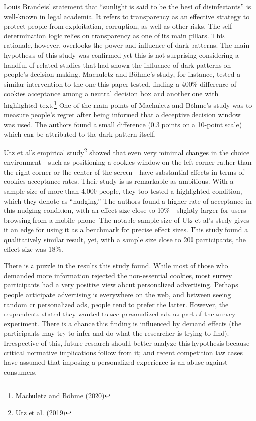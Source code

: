 \documentclass[
  11pt,
  letterpaper,
]{article}
\begin{document}
Louis Brandeis' statement that ``sunlight is said to be the best of disinfectants'' is well-known in legal academia. It refers to transparency as an effective strategy to protect people from exploitation, corruption, as well as other risks. The self-determination logic relies on transparency as one of its main pillars. This rationale, however, overlooks the power and influence of dark patterns. The main hypothesis of this study was confirmed yet this is not surprising considering a handful of related studies that had shown the influence of dark patterns on people's decision-making. Machuletz and Böhme's study, for instance, tested a similar intervention to the one this paper tested, finding a 400\% difference of cookies acceptance among a neutral decision box and another one with highlighted text.\footnote{Machuletz and Böhme (2020)} One of the main points of Machuletz and Böhme's study was to measure people's regret after being informed that a deceptive decision window was used. The authors found a small difference (0.3 points on a 10-point scale) which can be attributed to the dark pattern itself.

Utz et al's empirical study\footnote{Utz et al. (2019)} showed that even very minimal changes in the choice environment---such as positioning a cookies window on the left corner rather than the right corner or the center of the screen---have substantial effects in terms of cookies acceptance rates. Their study is as remarkable as ambitious. With a sample size of more than 4,000 people, they too tested a highlighted condition, which they denote as ``nudging.'' The authors found a higher rate of acceptance in this nudging condition, with an effect size close to 10\%---slightly larger for users browsing from a mobile phone. The notable sample size of Utz et al's study gives it an edge for using it as a benchmark for precise effect sizes. This study found a qualitatively similar result, yet, with a sample size close to 200 participants, the effect size was 18\%.

There is a puzzle in the results this study found. While most of those who demanded more information rejected the non-essential cookies, most survey participants had a very positive view about personalized advertising. Perhaps people anticipate advertising is everywhere on the web, and between seeing random or personalized ads, people tend to prefer the latter. However, the respondents stated they wanted to see personalized ads as part of the survey experiment. There is a chance this finding is influenced by demand effects (the participants may try to infer and do what the researcher is trying to find). Irrespective of this, future research should better analyze this hypothesis because critical normative implications follow from it; and recent competition law cases have assumed that imposing a personalized experience is an abuse against consumers.
\end{document}

